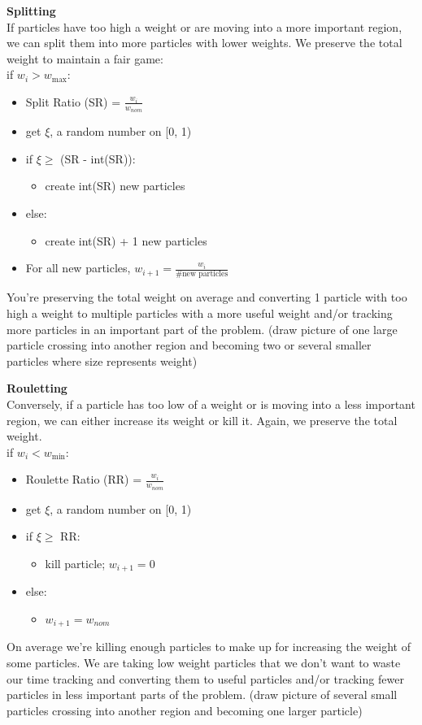 \documentclass[12pt]{article}
\begin{document}
\textbf{Splitting}\\
If particles have too high a weight or are moving into a more important region, we can split them into more particles with lower weights. We preserve the total weight to maintain a fair game:\\
\noindent\makebox[\linewidth]{\rule{\textwidth}{0.4pt}}
if $w_i > w_{\max}$:
\begin{itemize}
\item Split Ratio (SR) = $\frac{w_i}{w_{nom}}$
\item get $\xi$, a random number on [0, 1)
\item if $\xi \geq$ (SR - int(SR)):
  \begin{itemize}
  \item create int(SR) new particles
  \end{itemize}
\item else:
  \begin{itemize}
  \item create int(SR) + 1 new particles
  \end{itemize}
\item For all new particles, $w_{i+1} = \frac{w_i}{\# \text{new particles}}$
\end{itemize}
\noindent\makebox[\linewidth]{\rule{\textwidth}{0.4pt}}
%
You're preserving the total weight on average and converting 1 particle with too high a weight to multiple particles with a more useful weight and/or tracking more particles in an important part of the problem. (draw picture of one large particle crossing into another region and becoming two or several smaller particles where size represents weight)

\textbf{Rouletting}\\
Conversely, if a particle has too low of a weight or is moving into a less important region, we can either increase its weight or kill it. Again, we preserve the total weight.\\
\noindent\makebox[\linewidth]{\rule{\textwidth}{0.4pt}}
if $w_i < w_{\min}$:
\begin{itemize}
\item Roulette Ratio (RR) = $\frac{w_i}{w_{nom}}$
\item get $\xi$, a random number on [0, 1)
\item if $\xi \geq$ RR:
  \begin{itemize}
  \item kill particle; $w_{i+1} = 0$
  \end{itemize}
\item else:
  \begin{itemize}
  \item $w_{i+1} = w_{nom}$
  \end{itemize}
\end{itemize}
\noindent\makebox[\linewidth]{\rule{\textwidth}{0.4pt}}
%
On average we're killing enough particles to make up for increasing the weight of some particles. We are taking low weight particles that we don't want to waste our time tracking and converting them to useful particles and/or tracking fewer particles in less important parts of the problem. (draw picture of several small particles crossing into another region and becoming one larger particle)
\end{document}
